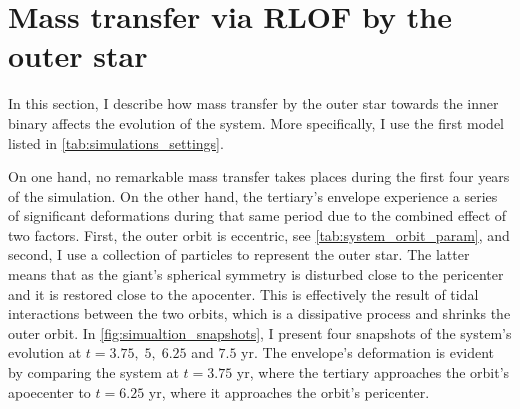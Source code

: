 \section{Mass transfer via RLOF by the outer star}\label{sec:mass_transfer_RLOF}

In this section, I describe how mass transfer by the outer star towards the inner binary affects the evolution of the system. More specifically, I use the first model listed in \cref{tab:simulations_settings}.

On one hand, no remarkable mass transfer takes places during the first four years of the simulation. On the other hand, the tertiary's envelope experience a series of significant deformations during that same period due to the combined effect of two factors. First, the outer orbit is eccentric, see \cref{tab:system_orbit_param}, and second, I use a collection of particles to represent the outer star. The latter means that as the giant's spherical symmetry is disturbed close to the pericenter and it is restored close to the apocenter. This is effectively the result of tidal interactions between the two orbits, which is a dissipative process and shrinks the outer orbit. In \cref{fig:simualtion_snapshots}, I present four snapshots of the system's evolution at $t = 3.75, \; 5, \; 6.25$ and $7.5$ yr. The envelope's deformation is evident by comparing the system at $t = 3.75$ yr, where the tertiary approaches the orbit's apoecenter to $t = 6.25$ yr, where it approaches the orbit's pericenter.
